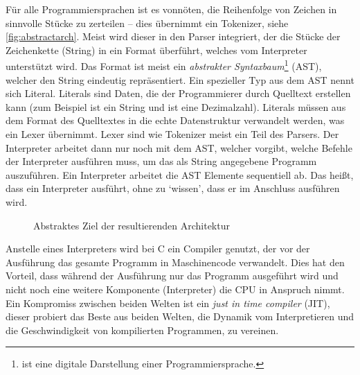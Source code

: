       Für alle Programmiersprachen ist es vonnöten, die Reihenfolge von Zeichen in sinnvolle Stücke zu zerteilen -- dies übernimmt ein Tokenizer, siehe \autoref{fig:abstractarch}. Meist wird dieser in den Parser \autocite[S.46]{eirund2013formale} integriert, der die Stücke der Zeichenkette (String) in ein Format überführt, welches vom Interpreter unterstützt wird. Das Format ist meist ein \emph{abstrakter Syntaxbaum}\footnote{
         ist eine digitale Darstellung einer Programmiersprache.
      } (AST), welcher den String eindeutig repräsentiert. Ein spezieller Typ aus dem AST nennt sich Literal. Literals sind Daten, die der Programmierer durch Quelltext erstellen kann (zum Beispiel ist  ein String und  ist eine Dezimalzahl). Literals müssen aus dem Format des Quelltextes in die echte Datenstruktur verwandelt werden, was ein Lexer übernimmt. Lexer sind wie Tokenizer meist ein Teil des Parsers. Der Interpreter arbeitet dann nur noch mit dem AST, welcher vorgibt, welche Befehle der Interpreter ausführen muss, um das als String angegebene Programm auszuführen. Ein Interpreter arbeitet die AST Elemente sequentiell ab. Das heißt, dass ein Interpreter  ausführt, ohne zu `wissen', dass er im Anschluss  ausführen wird.
      \begin{figure}[H]
        \centering
        \caption{Abstraktes Ziel der resultierenden Architektur}
        \label{fig:abstractarch}
      \end{figure}
      Anstelle eines Interpreters wird bei C ein Compiler genutzt, der vor der Ausführung das gesamte Programm in Maschinencode verwandelt. Dies hat den Vorteil, dass während der Ausführung nur das Programm ausgeführt wird und nicht noch eine weitere Komponente (Interpreter) die CPU in Anspruch nimmt. Ein Kompromiss zwischen beiden Welten ist ein \emph{just in time compiler} (JIT), dieser probiert das Beste aus beiden Welten, die Dynamik vom Interpretieren und die Geschwindigkeit von kompilierten Programmen, zu vereinen.

